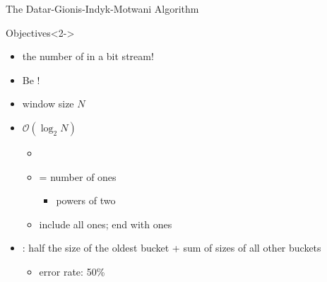 \begin{frame}{The Datar-Gionis-Indyk-Motwani Algorithm}
	\begin{block}{Objectives}<2->
		\begin{itemize}
			\item<3->
			 the number of  in a bit stream!

			\item<4->
			Be !
		\end{itemize}
	\end{block}
	\begin{itemize}
		\item<5->
		window size $N$

		\item<6->
		$\mathcal{O}(\log_2 N)$ 
		\begin{itemize}
			\item<8->

			\item<9->
			 = number of ones
			\begin{itemize}
				\item<10->
				powers of two
%
			\end{itemize}

			\item<11->
			include all ones; end with ones
		\end{itemize}
	
		\item<12->
		: half the size of the oldest bucket + sum of sizes of all other buckets
		\begin{itemize}
			\item<15->
			error rate: 50\%
		\end{itemize}
	

\end{itemize}
\end{frame}
